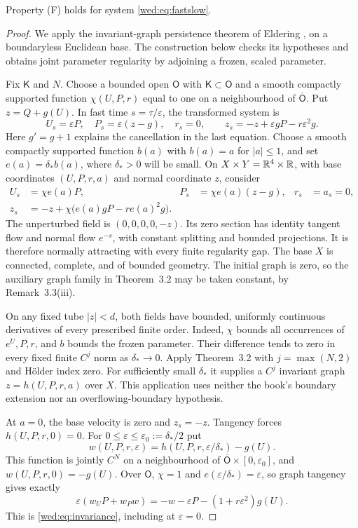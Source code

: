 \begin{lemma}\label{wed:lem:slowgraph}
Property \textup{(F)} holds for system \eqref{wed:eq:fastslow}.
\end{lemma}
\begin{proof}
We apply the invariant-graph persistence theorem of Eldering
\cite[Theorem~3.2 and Remark~3.3(iii)]{Eldering13}, on a boundaryless
Euclidean base. The construction below checks its hypotheses and obtains
joint parameter regularity by adjoining a frozen, scaled parameter.

Fix $\mathsf K$ and $N$. Choose a bounded open $\mathsf O$ with
$\mathsf K\subset\mathsf O$ and a smooth compactly supported function
$\chi(U,P,r)$ equal to one on a neighbourhood of $\overline{\mathsf O}$.
Put $z=Q+g(U)$. In fast time $s=\tau/\varepsilon$, the transformed system is
\[
 U_s=\varepsilon P,\quad P_s=\varepsilon(z-g),\quad r_s=0,
 \qquad z_s=-z+\varepsilon gP-r\varepsilon^2g.
\]
Here $g'=g+1$ explains the cancellation in the last equation.
Choose a smooth compactly supported function $b(a)$ with $b(a)=a$ for
$|a|\le1$, and set $e(a)=\delta_*b(a)$, where $\delta_*>0$ will be small.
On $X\times Y=\mathbb R^4\times\mathbb R$, with base coordinates $(U,P,r,a)$ and
normal coordinate $z$, consider
\begin{align*}
 U_s&=\chi e(a)P,&P_s&=\chi e(a)(z-g),&r_s&=a_s=0,\\
 z_s&=-z+\chi\bigl(e(a)gP-r e(a)^2g\bigr).
\end{align*}
The unperturbed field is $(0,0,0,0,-z)$. Its zero section has identity
tangent flow and normal flow $e^{-s}$, with constant splitting and bounded
projections. It is therefore normally attracting with every finite
regularity gap. The base $X$ is connected, complete, and of bounded geometry.
The initial graph is zero, so the auxiliary graph family in Theorem~3.2
may be taken constant, by Remark~3.3(iii).

On any fixed tube $|z|<d$, both fields have bounded, uniformly continuous
derivatives of every prescribed finite order. Indeed, $\chi$ bounds all
occurrences of $e^U,P,r$, and $b$ bounds the frozen parameter. Their
difference tends to zero in every fixed finite $C^j$ norm as
$\delta_*\to0$. Apply Theorem~3.2 with $j=\max(N,2)$ and H\"older index
zero. For sufficiently small $\delta_*$ it supplies a $C^j$ invariant
graph $z=h(U,P,r,a)$ over $X$. This application uses neither the book's
boundary extension nor an overflowing-boundary hypothesis.

At $a=0$, the base velocity is zero and $z_s=-z$. Tangency forces
$h(U,P,r,0)=0$. For $0\le\varepsilon\le\varepsilon_0:=\delta_*/2$ put
\[
 w(U,P,r,\varepsilon)
   =h(U,P,r,\varepsilon/\delta_*)-g(U).
\]
This function is jointly $C^N$ on a neighbourhood of
$\overline{\mathsf O}\times[0,\varepsilon_0]$, and $w(U,P,r,0)=-g(U)$.
Over $\mathsf O$, $\chi=1$ and $e(\varepsilon/\delta_*)=\varepsilon$,
so graph tangency gives exactly
\[
 \varepsilon(w_UP+w_Pw)=-w-\varepsilon P-(1+r\varepsilon^2)g(U).
\]
This is \eqref{wed:eq:invariance}, including at $\varepsilon=0$.
\end{proof}

